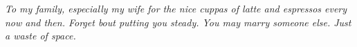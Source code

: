 \begin{dedication}
\emph{To my family, especially my wife for the nice cuppas of latte and espressos every now and then. Forget bout putting you steady. You may marry someone else. Just a waste of space.}%
\end{dedication}
